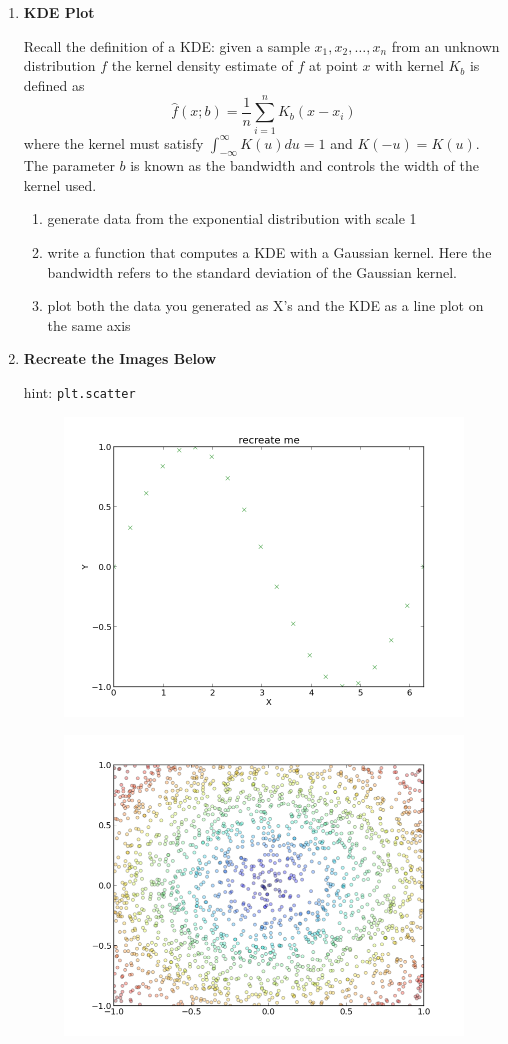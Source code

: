 \documentclass{article}
\begin{document}
\pagestyle{fancy}
\begin{enumerate}

\item \textbf{KDE Plot}

Recall the definition of a KDE: given a sample $x_1, x_2, \dots, x_n$ from an unknown distribution $f$ the kernel density estimate of $f$ at point $x$ with kernel $K_b$ is defined as 
$$\hat{f}(x;b) = \frac{1}{n}\sum_{i=1}^{n}K_b(x-x_i)$$
where the kernel must satisfy $\int_{-\infty}^{\infty}K(u)du = 1$ and $K(-u) = K(u).$ The parameter $b$ is known as the bandwidth and controls the width of the kernel used. 
\begin{enumerate}
\item generate data from the exponential distribution with scale 1 
\item write a function that computes a KDE with a Gaussian kernel. Here the bandwidth refers to the standard deviation of the Gaussian kernel.
\item plot both the data you generated as X's and the KDE as a line plot on the same axis
\end{enumerate}







\item \textbf{Recreate the Images Below}

hint: \texttt{plt.scatter}
\begin{figure}[h]
\centering
\includegraphics[width=.5\textwidth]{images/recreate_plot.png}
\end{figure}

\begin{figure}[h]
\centering
\includegraphics[width=.5\textwidth]{images/rainbow_plot.png}
\end{figure}


\end{enumerate}
\end{document}
